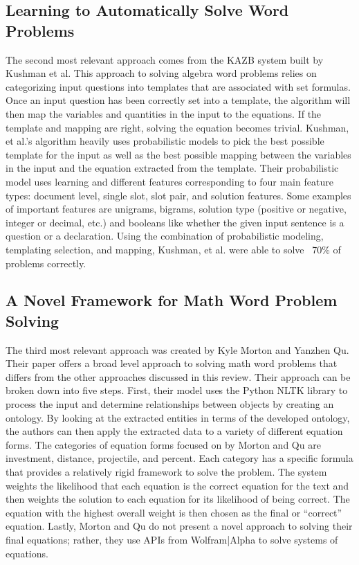 \documentclass[11pt]{article}
\begin{document}
\subsection{Learning to Automatically Solve Word Problems}
The second most relevant approach comes from the KAZB system built by Kushman et al. This approach to solving algebra word problems relies on categorizing input questions into templates that are associated with set formulas. Once an input question has been correctly set into a template, the algorithm will then map the variables and quantities in the input to the equations. If the template and mapping are right, solving the equation becomes trivial. Kushman, et al.’s algorithm heavily uses probabilistic models to pick the best possible template for the input as well as the best possible mapping between the variables in the input and the equation extracted from the template. Their probabilistic model uses learning and different features corresponding to four main feature types: document level, single slot, slot pair, and solution features. Some examples of important features are unigrams, bigrams, solution type (positive or negative, integer or decimal, etc.) and booleans like whether the given input sentence is a question or a declaration. Using the combination of probabilistic modeling, templating selection, and mapping, Kushman, et al. were able to solve ~70\% of problems correctly.

\subsection{A Novel Framework for Math Word Problem Solving}
The third most relevant approach was created by Kyle Morton and Yanzhen Qu. Their paper offers a broad level approach to solving math word problems that differs from the other approaches discussed in this review. Their approach can be broken down into five steps. First, their model uses the Python NLTK library to process the input and determine relationships between objects by creating an ontology. By looking at the extracted entities in terms of the developed ontology, the authors can then apply the extracted data to a variety of different equation forms. The categories of equation forms focused on by Morton and Qu are investment, distance, projectile, and percent. Each category has a specific formula that provides a relatively rigid framework to solve the problem. The system weights the likelihood that each equation is the correct equation for the text and then weights the solution to each equation for its likelihood of being correct. The equation with the highest overall weight is then chosen as the final or ``correct'' equation. Lastly, Morton and Qu do not present a novel approach to solving their final equations; rather, they use APIs from Wolfram|Alpha to solve systems of equations.
\end{document}
